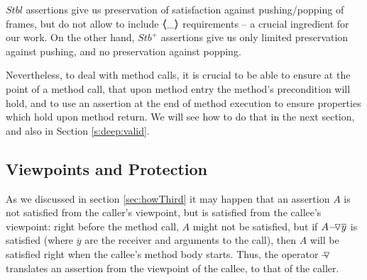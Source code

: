 { 
$Stbl$ assertions give us   preservation of satisfaction against pushing/popping of frames, but do not allow to include 
$\inside {\_}$ requirements -- a crucial ingredient for our work. On the other hand,
$Stb^+$ assertions  give us only limited preservation against pushing, and no preservation against popping. 


Nevertheless, to deal with method calls,  it is crucial to be able to ensure at the point of a method call, that upon method entry the method's precondition will hold, 
and to use an assertion at the end of method execution to ensure properties which hold upon method return.
We will see how to do that in the next section, and also in Section \ref{s:deep:valid}.
  
   
 \subsection{Viewpoints and Protection}
 \label{s:viewAndProtect}
 
 As we discussed in section \ref{sec:howThird} it may happen that an assertion $A$ is not satisfied from the caller’s
viewpoint, but is satisfied from the callee’s viewpoint:  right before the method call, $A$ might not be satisfied,
but if  $\PushASLong  {\overline y} A$ is satisfied (where $\overline y$ are the receiver and arguments to the call), then $A$
will be satisfied right when the callee’s method body starts. Thus, the operator $\pushSymbolAA$
 translates an assertion from the viewpoint of the callee, to that of the caller.
 

}
